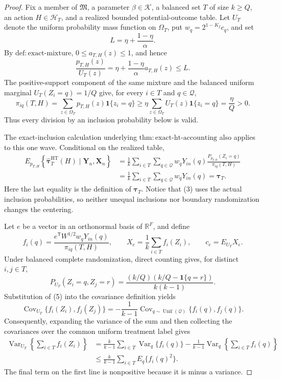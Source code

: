 \documentclass{article}
\begin{document}
\begin{proof}
Fix a member of \(\mathfrak M\), a parameter \(\beta\in\mathcal K\), a balanced set \(T\) of size \(k\geq Q\), an action \(H\in\mathcal H_T\), and a realized bounded potential-outcome table.  Let \(U_T\) denote the uniform probability mass function on \(\Omega_T\), put \(w_q=2^{1-K_f}c_q\), and set
\[
L=\eta+\frac{1-\eta}{\alpha}.
\]
By \(\mathrm{def{:}exact\text{-}mixture}\), \(0\leq a_{T,H}(z)\leq1\), and hence
\[
\frac{p_{T,H}(z)}{U_T(z)}
=\eta+\frac{1-\eta}{\alpha}a_{T,H}(z)
\leq L.
\tag{1}
\]
The positive-support component of the same mixture and the balanced uniform marginal \(U_T(Z_i=q)=1/Q\) give, for every \(i\in T\) and \(q\in\mathcal Q\),
\[
\pi_{iq}(T,H)
=\sum_{z\in\Omega_T}p_{T,H}(z)\mathbf 1\{z_i=q\}
\geq \eta\sum_{z\in\Omega_T}U_T(z)\mathbf 1\{z_i=q\}
=\frac{\eta}{Q}>0.
\tag{2}
\]
Thus every division by an inclusion probability below is valid.

The exact-inclusion calculation underlying \(\mathrm{thm{:}exact\text{-}ht\text{-}accounting}\) also applies to this one wave.  Conditional on the realized table,
\[
\begin{aligned}
E_{p_{T,H}}\!\left\{\widehat{\boldsymbol\tau}^{\mathrm{HT}}_T(H)\mid\mathbf Y_n,\mathbf X_n\right\}
&=\frac1k\sum_{i\in T}\sum_{q\in\mathcal Q}
w_qY_{in}(q)\frac{P_{p_{T,H}}(Z_i=q)}{\pi_{iq}(T,H)}\\
&=\frac1k\sum_{i\in T}\sum_{q\in\mathcal Q}w_qY_{in}(q)
=\boldsymbol\tau_T.
\end{aligned}
\tag{3}
\]
Here the last equality is the definition of \(\boldsymbol\tau_T\).  Notice that (3) uses the actual inclusion probabilities, so neither unequal inclusions nor boundary randomization changes the centering.

Let \(e\) be a vector in an orthonormal basis of \(\mathbb R^F\), and define
\[
f_i(q)=\frac{e^{\mathsf T}W^{1/2}w_qY_{in}(q)}{\pi_{iq}(T,H)},
\qquad
X_e=\frac1k\sum_{i\in T}f_i(Z_i),
\qquad
c_e=E_{U_T}X_e.
\tag{4}
\]
Under balanced complete randomization, direct counting gives, for distinct \(i,j\in T\),
\[
P_{U_T}(Z_i=q,Z_j=r)
=\frac{(k/Q)(k/Q-\mathbf 1\{q=r\})}{k(k-1)}.
\tag{5}
\]
Substitution of (5) into the covariance definition yields
\[
\operatorname{Cov}_{U_T}\{f_i(Z_i),f_j(Z_j)\}
=-\frac1{k-1}\operatorname{Cov}_{q\sim\operatorname{Unif}(\mathcal Q)}
\{f_i(q),f_j(q)\}.
\tag{6}
\]
Consequently, expanding the variance of the sum and then collecting the covariances over the common uniform treatment label gives
\[
\begin{aligned}
\operatorname{Var}_{U_T}\!\left\{\sum_{i\in T}f_i(Z_i)\right\}
&=\frac{k}{k-1}\sum_{i\in T}\operatorname{Var}_{q}\{f_i(q)\}
-\frac1{k-1}\operatorname{Var}_{q}\!\left\{\sum_{i\in T}f_i(q)\right\}\\
&\leq \frac{k}{k-1}\sum_{i\in T}E_q\{f_i(q)^2\}.
\end{aligned}
\tag{7}
\]
The final term on the first line is nonpositive because it is minus a variance.


\end{proof}
\end{document}
